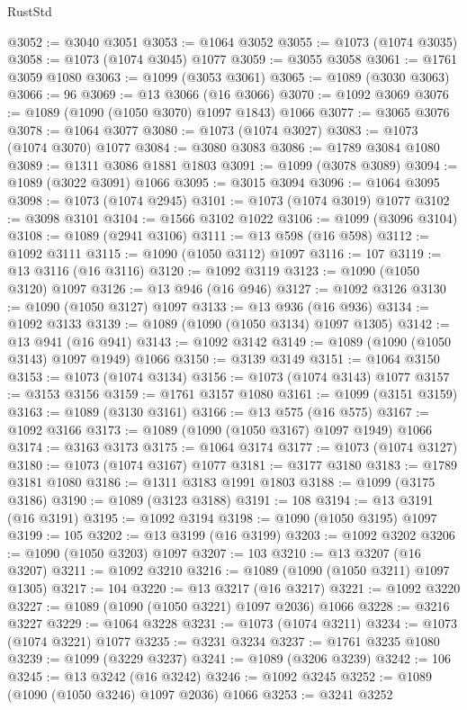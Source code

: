 \begin{lexlean}{RustStd}
\begin{coremodule}
@3052 := @3040 @3051
@3053 := @1064 @3052
@3055 := @1073 (@1074 @3035)
@3058 := @1073 (@1074 @3045) @1077
@3059 := @3055 @3058
@3061 := @1761 @3059 @1080
@3063 := @1099 (@3053 @3061)
@3065 := @1089 (@3030 @3063)
@3066 := 96
@3069 := @13 @3066 (@16 @3066)
@3070 := @1092 @3069
@3076 := @1089 (@1090 (@1050 @3070) @1097 @1843) @1066
@3077 := @3065 @3076
@3078 := @1064 @3077
@3080 := @1073 (@1074 @3027)
@3083 := @1073 (@1074 @3070) @1077
@3084 := @3080 @3083
@3086 := @1789 @3084 @1080
@3089 := @1311 @3086 @1881 @1803
@3091 := @1099 (@3078 @3089)
@3094 := @1089 (@3022 @3091) @1066
@3095 := @3015 @3094
@3096 := @1064 @3095
@3098 := @1073 (@1074 @2945)
@3101 := @1073 (@1074 @3019) @1077
@3102 := @3098 @3101
@3104 := @1566 @3102 @1022
@3106 := @1099 (@3096 @3104)
@3108 := @1089 (@2941 @3106)
@3111 := @13 @598 (@16 @598)
@3112 := @1092 @3111
@3115 := @1090 (@1050 @3112) @1097
@3116 := 107
@3119 := @13 @3116 (@16 @3116)
@3120 := @1092 @3119
@3123 := @1090 (@1050 @3120) @1097
@3126 := @13 @946 (@16 @946)
@3127 := @1092 @3126
@3130 := @1090 (@1050 @3127) @1097
@3133 := @13 @936 (@16 @936)
@3134 := @1092 @3133
@3139 := @1089 (@1090 (@1050 @3134) @1097 @1305)
@3142 := @13 @941 (@16 @941)
@3143 := @1092 @3142
@3149 := @1089 (@1090 (@1050 @3143) @1097 @1949) @1066
@3150 := @3139 @3149
@3151 := @1064 @3150
@3153 := @1073 (@1074 @3134)
@3156 := @1073 (@1074 @3143) @1077
@3157 := @3153 @3156
@3159 := @1761 @3157 @1080
@3161 := @1099 (@3151 @3159)
@3163 := @1089 (@3130 @3161)
@3166 := @13 @575 (@16 @575)
@3167 := @1092 @3166
@3173 := @1089 (@1090 (@1050 @3167) @1097 @1949) @1066
@3174 := @3163 @3173
@3175 := @1064 @3174
@3177 := @1073 (@1074 @3127)
@3180 := @1073 (@1074 @3167) @1077
@3181 := @3177 @3180
@3183 := @1789 @3181 @1080
@3186 := @1311 @3183 @1991 @1803
@3188 := @1099 (@3175 @3186)
@3190 := @1089 (@3123 @3188)
@3191 := 108
@3194 := @13 @3191 (@16 @3191)
@3195 := @1092 @3194
@3198 := @1090 (@1050 @3195) @1097
@3199 := 105
@3202 := @13 @3199 (@16 @3199)
@3203 := @1092 @3202
@3206 := @1090 (@1050 @3203) @1097
@3207 := 103
@3210 := @13 @3207 (@16 @3207)
@3211 := @1092 @3210
@3216 := @1089 (@1090 (@1050 @3211) @1097 @1305)
@3217 := 104
@3220 := @13 @3217 (@16 @3217)
@3221 := @1092 @3220
@3227 := @1089 (@1090 (@1050 @3221) @1097 @2036) @1066
@3228 := @3216 @3227
@3229 := @1064 @3228
@3231 := @1073 (@1074 @3211)
@3234 := @1073 (@1074 @3221) @1077
@3235 := @3231 @3234
@3237 := @1761 @3235 @1080
@3239 := @1099 (@3229 @3237)
@3241 := @1089 (@3206 @3239)
@3242 := 106
@3245 := @13 @3242 (@16 @3242)
@3246 := @1092 @3245
@3252 := @1089 (@1090 (@1050 @3246) @1097 @2036) @1066
@3253 := @3241 @3252

\end{coremodule}
\end{lexlean}
